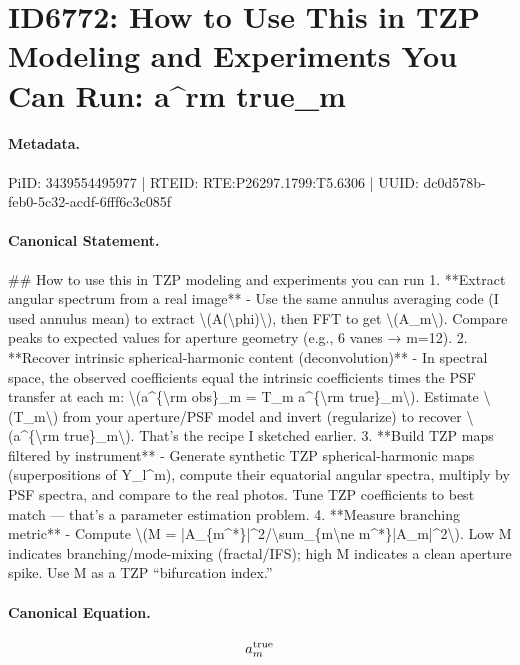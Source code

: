 \section*{ID6772: How to Use This in TZP Modeling and Experiments You Can Run: a\textasciicircum{}rm true\_m}
\paragraph{Metadata.}
PiID: 3439554495977 | RTEID: RTE:P26297.1799:T5.6306 | UUID: dc0d578b-feb0-5c32-acdf-6fff6c3c085f

\paragraph{Canonical Statement.}
\#\# How to use this in TZP modeling and experiments you can run 1. **Extract angular spectrum from a real image** - Use the same annulus averaging code (I used annulus mean) to extract \textbackslash{}(A(\textbackslash{}phi)\textbackslash{}), then FFT to get \textbackslash{}(A\_m\textbackslash{}). Compare peaks to expected values for aperture geometry (e.g., 6 vanes → m=12). 2. **Recover intrinsic spherical-harmonic content (deconvolution)** - In spectral space, the observed coefficients equal the intrinsic coefficients times the PSF transfer at each m: \textbackslash{}(a\textasciicircum{}\{\textbackslash{}rm obs\}\_m = T\_m a\textasciicircum{}\{\textbackslash{}rm true\}\_m\textbackslash{}). Estimate \textbackslash{}(T\_m\textbackslash{}) from your aperture/PSF model and invert (regularize) to recover \textbackslash{}(a\textasciicircum{}\{\textbackslash{}rm true\}\_m\textbackslash{}). That’s the recipe I sketched earlier. 3. **Build TZP maps filtered by instrument** - Generate synthetic TZP spherical-harmonic maps (superpositions of Y\_l\textasciicircum{}m), compute their equatorial angular spectra, multiply by PSF spectra, and compare to the real photos. Tune TZP coefficients to best match — that’s a parameter estimation problem. 4. **Measure branching metric** - Compute \textbackslash{}(M = |A\_\{m\textasciicircum{}*\}|\textasciicircum{}2/\textbackslash{}sum\_\{m\textbackslash{}ne m\textasciicircum{}*\}|A\_m|\textasciicircum{}2\textbackslash{}). Low M indicates branching/mode-mixing (fractal/IFS); high M indicates a clean aperture spike. Use M as a TZP “bifurcation index.”

\paragraph{Canonical Equation.}
\[
a^{\rm true}_m
\]

